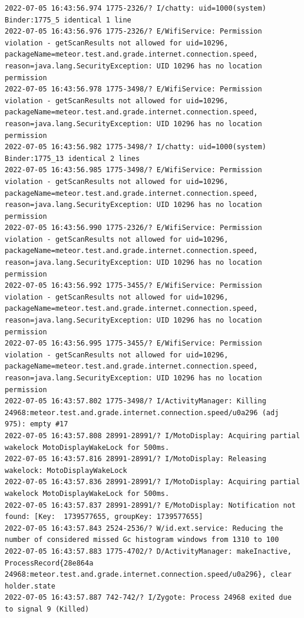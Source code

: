 \documentclass[a4paper,12pt]{book}
\begin{document}
\begin{lstlisting}
2022-07-05 16:43:56.974 1775-2326/? I/chatty: uid=1000(system) Binder:1775_5 identical 1 line
2022-07-05 16:43:56.976 1775-2326/? E/WifiService: Permission violation - getScanResults not allowed for uid=10296, packageName=meteor.test.and.grade.internet.connection.speed, reason=java.lang.SecurityException: UID 10296 has no location permission
2022-07-05 16:43:56.978 1775-3498/? E/WifiService: Permission violation - getScanResults not allowed for uid=10296, packageName=meteor.test.and.grade.internet.connection.speed, reason=java.lang.SecurityException: UID 10296 has no location permission
2022-07-05 16:43:56.982 1775-3498/? I/chatty: uid=1000(system) Binder:1775_13 identical 2 lines
2022-07-05 16:43:56.985 1775-3498/? E/WifiService: Permission violation - getScanResults not allowed for uid=10296, packageName=meteor.test.and.grade.internet.connection.speed, reason=java.lang.SecurityException: UID 10296 has no location permission
2022-07-05 16:43:56.990 1775-2326/? E/WifiService: Permission violation - getScanResults not allowed for uid=10296, packageName=meteor.test.and.grade.internet.connection.speed, reason=java.lang.SecurityException: UID 10296 has no location permission
2022-07-05 16:43:56.992 1775-3455/? E/WifiService: Permission violation - getScanResults not allowed for uid=10296, packageName=meteor.test.and.grade.internet.connection.speed, reason=java.lang.SecurityException: UID 10296 has no location permission
2022-07-05 16:43:56.995 1775-3455/? E/WifiService: Permission violation - getScanResults not allowed for uid=10296, packageName=meteor.test.and.grade.internet.connection.speed, reason=java.lang.SecurityException: UID 10296 has no location permission
2022-07-05 16:43:57.802 1775-3498/? I/ActivityManager: Killing 24968:meteor.test.and.grade.internet.connection.speed/u0a296 (adj 975): empty #17
2022-07-05 16:43:57.808 28991-28991/? I/MotoDisplay: Acquiring partial wakelock MotoDisplayWakeLock for 500ms.
2022-07-05 16:43:57.816 28991-28991/? I/MotoDisplay: Releasing wakelock: MotoDisplayWakeLock
2022-07-05 16:43:57.836 28991-28991/? I/MotoDisplay: Acquiring partial wakelock MotoDisplayWakeLock for 500ms.
2022-07-05 16:43:57.837 28991-28991/? E/MotoDisplay: Notification not found: [Key:  1739577655, groupKey: 1739577655]
2022-07-05 16:43:57.843 2524-2536/? W/id.ext.service: Reducing the number of considered missed Gc histogram windows from 1310 to 100
2022-07-05 16:43:57.883 1775-4702/? D/ActivityManager: makeInactive, ProcessRecord{28e864a 24968:meteor.test.and.grade.internet.connection.speed/u0a296}, clear holder.state
2022-07-05 16:43:57.887 742-742/? I/Zygote: Process 24968 exited due to signal 9 (Killed)

\end{lstlisting}
\end{document}
